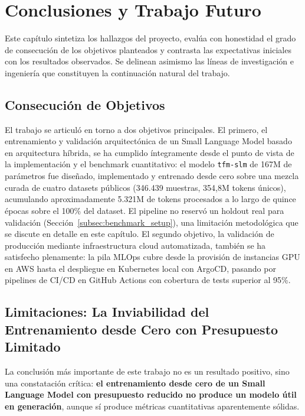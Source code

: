 \section{Conclusiones y Trabajo Futuro}
\label{sec:conclusiones}

Este capítulo sintetiza los hallazgos del proyecto, evalúa con honestidad el grado de consecución de los objetivos planteados y contrasta las expectativas iniciales con los resultados observados. Se delinean asimismo las líneas de investigación e ingeniería que constituyen la continuación natural del trabajo.

\subsection{Consecución de Objetivos}

El trabajo se articuló en torno a dos objetivos principales. El primero, el entrenamiento y validación arquitectónica de un Small Language Model basado en arquitectura híbrida, se ha cumplido íntegramente desde el punto de vista de la implementación y el benchmark cuantitativo: el modelo \texttt{tfm-slm} de 167M de parámetros fue diseñado, implementado y entrenado desde cero sobre una mezcla curada de cuatro datasets públicos (346.439 muestras, 354,8M tokens únicos), acumulando aproximadamente 5.321M de tokens procesados a lo largo de quince épocas sobre el 100\% del dataset. El pipeline no reservó un holdout real para validación (Sección~\ref{subsec:benchmark_setup}), una limitación metodológica que se discute en detalle en este capítulo. El segundo objetivo, la validación de producción mediante infraestructura cloud automatizada, también se ha satisfecho plenamente: la pila MLOps cubre desde la provisión de instancias GPU en AWS hasta el despliegue en Kubernetes local con ArgoCD, pasando por pipelines de CI/CD en GitHub Actions con cobertura de tests superior al 95\%.

\subsection{Limitaciones: La Inviabilidad del Entrenamiento desde Cero con Presupuesto Limitado}

La conclusión más importante de este trabajo no es un resultado positivo, sino una constatación crítica: \textbf{el entrenamiento desde cero de un Small Language Model con presupuesto reducido no produce un modelo útil en generación}, aunque sí produce métricas cuantitativas aparentemente sólidas.

